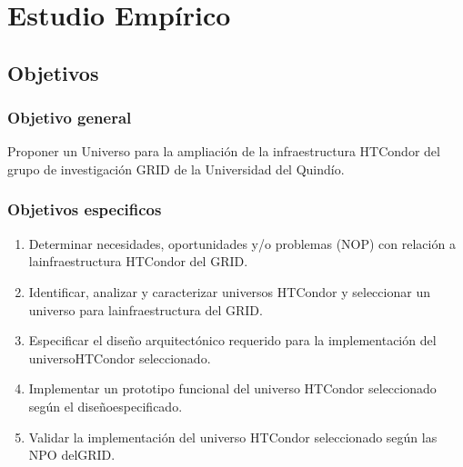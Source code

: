 

\part{Estudio Empírico}

\chapter*{Objetivos}

\section{Objetivo general}

Proponer un Universo para la ampliación de la infraestructura HTCondor del grupo de
investigación GRID de la Universidad del Quindío.

\section{Objetivos especificos}

\begin{enumerate}
    \item Determinar necesidades, oportunidades y/o problemas (NOP) con relación a lainfraestructura HTCondor del GRID.
    \item Identificar, analizar y caracterizar universos HTCondor y seleccionar un universo para lainfraestructura del GRID.
    \item Especificar el diseño arquitectónico requerido para la implementación del universoHTCondor seleccionado.
    \item Implementar un prototipo funcional del universo HTCondor seleccionado según el diseñoespecificado.
    \item Validar la implementación del universo HTCondor seleccionado según las NPO delGRID.
\end{enumerate}


